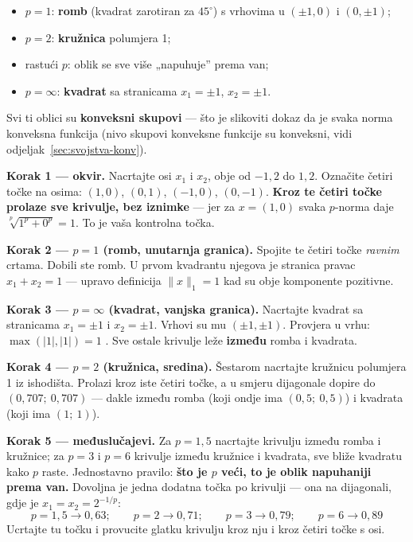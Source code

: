 \begin{itemize}
  \item $p = 1$: \textbf{romb} (kvadrat zarotiran za $45^\circ$) s vrhovima u
        $(\pm1, 0)$ i $(0, \pm1)$;
  \item $p = 2$: \textbf{kružnica} polumjera 1;
  \item rastući $p$: oblik se sve više „napuhuje” prema van;
  \item $p = \infty$: \textbf{kvadrat} sa stranicama $x_1 = \pm1$,
        $x_2 = \pm1$.
\end{itemize}

Svi ti oblici su \textbf{konveksni skupovi} --- što je slikoviti dokaz da je
svaka norma konveksna funkcija (nivo skupovi konveksne funkcije su konveksni,
vidi odjeljak~\ref{sec:svojstva-konv}).

\begin{crtanje}
\textbf{Korak 1 --- okvir.} Nacrtajte osi $x_1$ i $x_2$, obje od $-1{,}2$ do
$1{,}2$. Označite četiri točke na osima: $(1,0)$, $(0,1)$, $(-1,0)$, $(0,-1)$.
\textbf{Kroz te četiri točke prolaze sve krivulje, bez iznimke} --- jer za
$x = (1,0)$ svaka $p$-norma daje $\sqrt[p]{1^p + 0^p} = 1$. To je vaša
kontrolna točka.

\textbf{Korak 2 --- $p = 1$ (romb, unutarnja granica).} Spojite te četiri točke
\emph{ravnim} crtama. Dobili ste romb. U prvom kvadrantu njegova je stranica
pravac $x_1 + x_2 = 1$ --- upravo definicija $\|x\|_1 = 1$ kad su obje
komponente pozitivne.

\textbf{Korak 3 --- $p = \infty$ (kvadrat, vanjska granica).} Nacrtajte kvadrat
sa stranicama $x_1 = \pm1$ i $x_2 = \pm1$. Vrhovi su mu $(\pm1,\pm1)$. Provjera
u vrhu: $\max(|1|,|1|) = 1$ \checkmark. Sve ostale krivulje leže
\textbf{između} romba i kvadrata.

\textbf{Korak 4 --- $p = 2$ (kružnica, sredina).} Šestarom nacrtajte kružnicu
polumjera 1 iz ishodišta. Prolazi kroz iste četiri točke, a u smjeru dijagonale
dopire do $(0{,}707;\ 0{,}707)$ --- dakle između romba (koji ondje ima
$(0{,}5;\ 0{,}5)$) i kvadrata (koji ima $(1;\ 1)$).

\textbf{Korak 5 --- međuslučajevi.} Za $p = 1{,}5$ nacrtajte krivulju između
romba i kružnice; za $p = 3$ i $p = 6$ krivulje između kružnice i kvadrata, sve
bliže kvadratu kako $p$ raste. Jednostavno pravilo: \textbf{što je $p$ veći, to
je oblik napuhaniji prema van.} Dovoljna je jedna dodatna točka po krivulji ---
ona na dijagonali, gdje je $x_1 = x_2 = 2^{-1/p}$:
\[
p=1{,}5 \to 0{,}63; \qquad p=2 \to 0{,}71; \qquad
p=3 \to 0{,}79; \qquad p=6 \to 0{,}89
\]
Ucrtajte tu točku i provucite glatku krivulju kroz nju i kroz četiri točke s
osi.


\end{crtanje}
